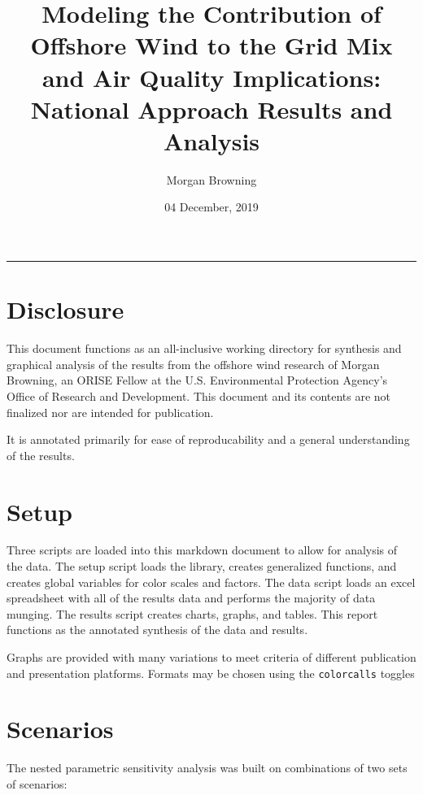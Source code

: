 \documentclass[]{article}
\title{Modeling the Contribution of Offshore Wind to the Grid Mix and Air
Quality Implications: National Approach Results and Analysis}
\author{Morgan Browning}
\date{04 December, 2019}
\begin{document}
\maketitle

{
\setcounter{tocdepth}{2}
\tableofcontents
}
\begin{center}\rule{0.5\linewidth}{\linethickness}\end{center}

\hypertarget{disclosure}{%
\section{Disclosure}\label{disclosure}}

This document functions as an all-inclusive working directory for
synthesis and graphical analysis of the results from the offshore wind
research of Morgan Browning, an ORISE Fellow at the U.S. Environmental
Protection Agency's Office of Research and Development. This document
and its contents are not finalized nor are intended for publication.

It is annotated primarily for ease of reproducability and a general
understanding of the results.

\hypertarget{setup}{%
\section{Setup}\label{setup}}

Three scripts are loaded into this markdown document to allow for
analysis of the data. The setup script loads the library, creates
generalized functions, and creates global variables for color scales and
factors. The data script loads an excel spreadsheet with all of the
results data and performs the majority of data munging. The results
script creates charts, graphs, and tables. This report functions as the
annotated synthesis of the data and results.

Graphs are provided with many variations to meet criteria of different
publication and presentation platforms. Formats may be chosen using the
\texttt{colorcalls} toggles

\hypertarget{scenarios}{%
\section{Scenarios}\label{scenarios}}

The nested parametric sensitivity analysis was built on combinations of
two sets of scenarios:
\end{document}

